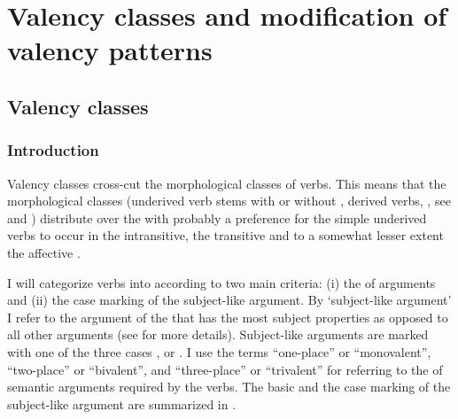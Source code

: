\chapter{Valency classes and modification of valency patterns}
\label{cpt:Verb valency classes}


\section{Valency classes}
\label{sec:Verb valency classes}

\subsection{Introduction}
\label{sec:valencyclassesintro}

Valency classes cross-cut the morphological classes of verbs. This means that the morphological classes (underived verb stems with or without , derived verbs, , see   and ) distribute over the  with probably a preference for the simple underived verbs to occur in the intransitive, the transitive and to a somewhat lesser extent the affective .

I will categorize verbs into  according to two main criteria: (i) the  of arguments and (ii) the case marking of the subject-like argument. By `subject-like argument' I refer to the argument of the  that has the most subject properties as opposed to all other arguments (see  for more details). Subject-like arguments are marked with one of the three cases ,  or . I use the terms ``one-place'' or ``monovalent'', ``two-place'' or ``bivalent'', and ``three-place'' or ``trivalent'' for referring to the  of semantic arguments required by the verbs. The basic  and the case marking of the subject-like argument are summarized in .



